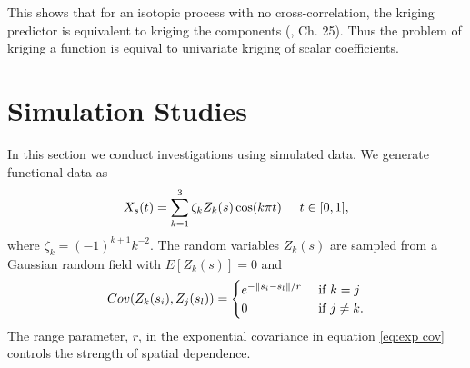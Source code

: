 This shows that for an isotopic process with no cross-correlation, the kriging predictor is equivalent to kriging the components (\cite{wackernagel2003multivariate}, Ch. 25). Thus the problem of kriging a function is equival to univariate kriging of scalar coefficients. 

	



\section{Simulation Studies} 

\label{sec:numerical_experiments}

In this section we conduct investigations using simulated data. We generate functional data as
\begin{equation}\label{eq:sim process2} 
	X_s(t) = \sum^{3}_{k=1}\zeta_k Z_k(s) \cos(k\pi t) \hspace{0.5cm} t \in [0,1], 
\end{equation}
where \(\zeta_k=(-1)^{k+1}k^{-2}\). The random variables $Z_k(s)$ are sampled from a Gaussian random field with $E[Z_k(s)]=0$ and 
\begin{equation}\label{eq:exp cov}
	Cov(Z_k(s_i), Z_j(s_l)) = \begin{cases} 
																e^{-\left\|s_i - s_l\right\|/r} &\mbox{ if } k = j\\
																0 & \mbox{ if } j \neq k.
															\end{cases}
\end{equation} 
The range parameter, $r$, in the exponential covariance in equation \eqref{eq:exp cov} controls the strength of spatial dependence. 

